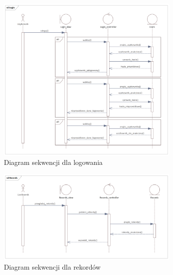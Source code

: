 \documentclass{sprz}
\begin{document}
\begin{figure}[h]
  \centering
  \includegraphics[width=0.8\textwidth]{sprz/sequence_login}
  \caption{Diagram sekwencji dla logowania}
  \label{img:sequence_login}
\end{figure}

\begin{figure}[h]
  \centering
  \includegraphics[width=0.8\textwidth]{sprz/sequence_records}
  \caption{Diagram sekwencji dla rekordów}
  \label{img:sequence_records}
\end{figure}

\printbibliography[title={Bibliografia}, heading=bibintoc]
\end{document}
